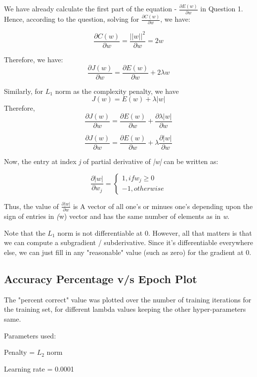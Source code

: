 \documentclass{article}
\begin{document}
We have already calculate the first part of the equation - $\frac{\partial E(w)}{\partial w}$ in Question 1. Hence, according to the question, solving for $\frac{\partial C(w)}{\partial w}$, we have:

$$\frac{\partial C(w)}{\partial w} = \frac{||w||^2}{\partial w} = 2w$$

Therefore, we have:
$$\frac{\partial J(w)}{\partial w} = \frac{\partial E(w)}{\partial w} + 2\lambda w$$

Similarly, for $L_{1}$ norm as the complexity penalty, we have 
$$J(w) = E(w) + \lambda |w|$$
Therefore, 
$$\frac{\partial J(w)}{\partial w} = \frac{\partial E(w)}{\partial w} + \frac{\partial \lambda |w|}{\partial w}$$

$$\frac{\partial J(w)}{\partial w} = \frac{\partial E(w)}{\partial w} + \lambda \frac{\partial |w|}{\partial w}$$

Now, the entry at index \emph{j} of partial derivative of \emph{|w|} can be written as: 

\[
	\frac{\partial |w|}{\partial w_j} = \left\{
                \begin{array}{ll}
                  1, if w_j \geq 0\\
                  -1, otherwise
                \end{array}
              \right.
\]

Thus, the value of $\frac{\partial |w|}{\partial w}$ is A vector of all one's or minues one's depending upon the sign of entries in \emph(w) vector and has the same number of elements as in \emph{w}.

Note that the $L_{1}$ norm is not differentiable at 0. However, all that matters is that we can compute a subgradient / subderivative. Since it's differentiable everywhere else, we can just fill in any "reasonable" value (such as zero) for the gradient at 0.
 
\subsection{Accuracy Percentage v/s Epoch Plot}

The "percent correct" value was plotted over the number of training iterations for the training set, for different lambda values keeping the other hyper-parameters same. 

Parameters used: 

Penalty = $L_{2}$ norm

Learning rate \eta = 0.0001
\end{document}
